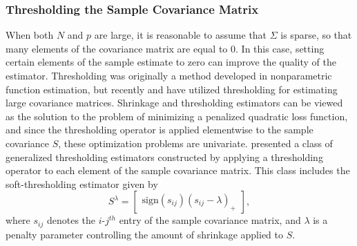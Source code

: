\bigskip
\subsubsection{Thresholding the Sample Covariance Matrix} \label{chapter-1-thresholding-estimators}


When both $N$ and $p$ are large, it is reasonable to assume that $\Sigma$ is sparse, so that many elements of the covariance matrix are equal to 0. In this case, setting certain elements of the sample estimate to zero can improve the quality of the estimator. Thresholding was originally a method developed in nonparametric function estimation, but recently \cite{bickel2008covariance} and \cite{rothman2009generalized} have utilized thresholding for estimating large covariance matrices.  Shrinkage and thresholding estimators can be viewed as the solution to the problem of minimizing a penalized quadratic loss function, and since the thresholding operator is applied elementwise to the sample covariance $S$,  these optimization problems are univariate. \cite{rothman2009generalized} presented a class of generalized thresholding estimators constructed by applying a thresholding operator to each element of the sample covariance matrix. This class includes the soft-thresholding estimator given by
\[
S^{\lambda}=   \begin{bmatrix} \mbox{sign}\left(s_{ij}\right) \left(s_{ij} - \lambda\right)_+ \end{bmatrix},
\]
\noindent 
where $s_{ij}$ denotes the $i$-$j^{th}$ entry of the sample covariance matrix, and $\lambda$ is a penalty parameter controlling the amount of shrinkage applied to $S$. 

